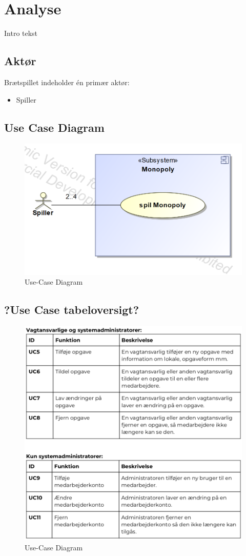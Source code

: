\documentclass[../main.tex]{subfiles}
\begin{document}
\section{Analyse}

\begin{flushleft} 
Intro tekst
\end{flushleft}


\subsection{Aktør}
Brætspillet indeholder én primær aktør:
\begin{itemize}
  \item  Spiller \\
\end{itemize}


\subsection{Use Case Diagram}
\begin{figure}[H]
    \centering
    \includegraphics[width=0.6\linewidth]{figures/use-case_Diagram.png}
    \caption{Use-Case Diagram}
    \label{fig:UCDia}
\end{figure}

\newpage 

\subsection{?Use Case tabeloversigt?}
\begin{figure}[H]
    \centering
    \includegraphics[width=0.6\linewidth]{figures/use-case-tabel-portalen.png}
    \caption{Use-Case Diagram}
    \label{fig:UCDia}
\end{figure}
\end{document}
